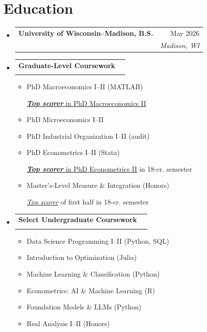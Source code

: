 \documentclass[letterpaper,11pt]{article}
\makeatletter
\newcommand{\resumeSubheading}[4]{\vspace{-2pt}\item
  \begin{tabular*}{0.97\textwidth}[t]{l@{\extracolsep{\fill}}r}
    \textbf{#1} & #2 \\
    \textit{\small#3} & \textit{\small #4} \\
  \end{tabular*}\vspace{-7pt}}
\newcommand{\resumeSubHeadingListStart}{\begin{itemize}[leftmargin=0.15in, label={}]}
\newcommand{\resumeSubHeadingListEnd}{\end{itemize}}
\makeatother
\begin{document}
\section{Education}
  \resumeSubHeadingListStart
    \resumeSubheading
      {University of Wisconsin--Madison, B.S.}{May 2026}
      {\parbox[t]{0.65\textwidth}{Triple Major: Economics, Mathematics, and Data Science \\ \textnormal{\textbf{Recent GPA (since Summer 2024): 3.9} $|$ Overall GPA: 3.3}}}{Madison, WI}%
      \vspace{2mm}
    \resumeSubheading
      {Graduate-Level Coursework}{}{}{}
      \vspace{-5.5mm}
      \begin{multicols}{2}
      \begin{itemize}[label={}]
        \item PhD Macroeconomics I--II (MATLAB) \parbox[t]{0.5\textwidth}{\vspace{-0.8em} \footnotesize \underline{\textbf{\textit{Top scorer}} in PhD Macroeconomics II}}
        \item PhD Microeconomics I--II
        \item PhD Industrial Organization I--II (audit)
        \item PhD Econometrics I--II (Stata) \parbox[t]{0.5\textwidth}{\vspace{-0.8em} \footnotesize \underline{\textbf{\textit{Top scorer}} in PhD Econometrics II} in 18-cr. semester}
        \item Master’s-Level Measure \& Integration (Honors) \parbox[t]{0.5\textwidth}{\vspace{-0.9em} \footnotesize \underline{\textit{Top scorer}} of first half in 18-cr. semester}
      \end{itemize}
      \end{multicols}
      \vspace{-5mm}
    \resumeSubheading
      {Select Undergraduate Coursework}{}{}{}
      \vspace{-5.5mm}
      \begin{multicols}{2}
      \begin{itemize}[label={}]
          \item Data Science Programming I--II (Python, SQL)
          \item Introduction to Optimization (Julia)
          \item Machine Learning \& Classification (Python)
          \item Econometrics: AI \& Machine Learning (R)
          \item Foundation Models \& LLMs (Python)
          \item Real Analysis I--II (Honors)
      \end{itemize}
      \end{multicols}
  \resumeSubHeadingListEnd
\end{document}
